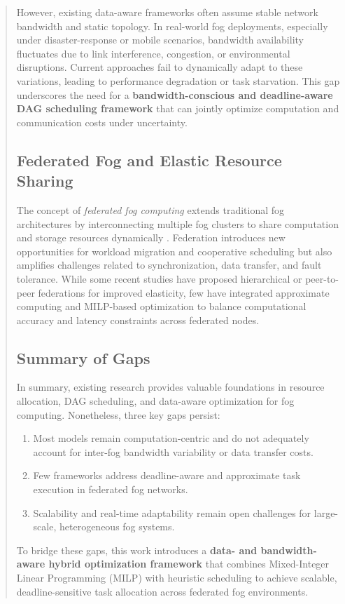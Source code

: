 \documentclass[conference]{IEEEtran}
\begin{document}
\begin{abstract}
However, existing data-aware frameworks often assume stable network bandwidth and static topology. In real-world fog deployments, especially under disaster-response or mobile scenarios, bandwidth availability fluctuates due to link interference, congestion, or environmental disruptions. Current approaches fail to dynamically adapt to these variations, leading to performance degradation or task starvation. This gap underscores the need for a \textbf{bandwidth-conscious and deadline-aware DAG scheduling framework} that can jointly optimize computation and communication costs under uncertainty.

\subsection{Federated Fog and Elastic Resource Sharing}
The concept of \textit{federated fog computing} extends traditional fog architectures by interconnecting multiple fog clusters to share computation and storage resources dynamically \cite{fgcs2024}. Federation introduces new opportunities for workload migration and cooperative scheduling but also amplifies challenges related to synchronization, data transfer, and fault tolerance. While some recent studies have proposed hierarchical or peer-to-peer federations for improved elasticity, few have integrated approximate computing and MILP-based optimization to balance computational accuracy and latency constraints across federated nodes.

\subsection{Summary of Gaps}
In summary, existing research provides valuable foundations in resource allocation, DAG scheduling, and data-aware optimization for fog computing. Nonetheless, three key gaps persist:
\begin{enumerate}
    \item Most models remain computation-centric and do not adequately account for inter-fog bandwidth variability or data transfer costs.
    \item Few frameworks address deadline-aware and approximate task execution in federated fog networks.
    \item Scalability and real-time adaptability remain open challenges for large-scale, heterogeneous fog systems.
\end{enumerate}

To bridge these gaps, this work introduces a \textbf{data- and bandwidth-aware hybrid optimization framework} that combines Mixed-Integer Linear Programming (MILP) with heuristic scheduling to achieve scalable, deadline-sensitive task allocation across federated fog environments.



\end{abstract}
\end{document}
